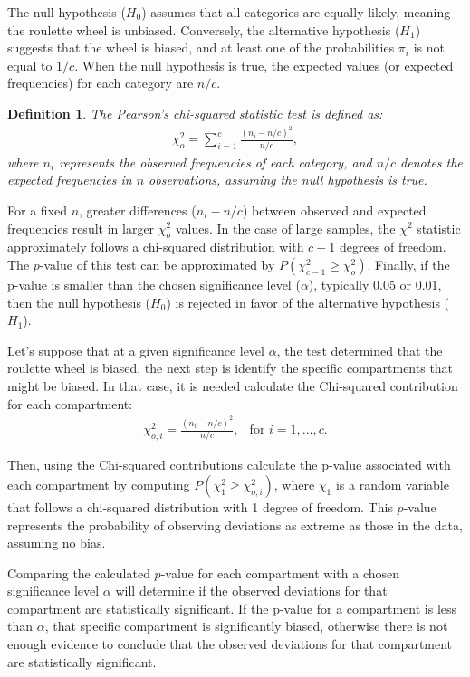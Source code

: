 \documentclass[11pt,twoside]{article}
\newtheorem{Definition}{Definition}
\numberwithin{Theorem}{section}
\numberwithin{Definition}{section}
\numberwithin{Lemma}{section}
\numberwithin{Algorithm}{section}
\numberwithin{equation}{section}
\begin{document}
The null hypothesis ($H_{0}$) assumes that all categories are equally likely, meaning the roulette wheel is unbiased. Conversely, the alternative hypothesis ($H_{1}$) suggests that the wheel is biased, and at least one of the probabilities $\pi_{i}$ is not equal to $1/c$. When the null hypothesis is true, the expected values (or expected frequencies) for each category are $n/c$.

\begin{Definition}
The Pearson's chi-squared statistic test is defined as:
\begin{eqnarray}
\chi_{o}^2 = \sum_{i=1}^{c}\frac{(n_{i} - n/c)^2}{n/c},
\end{eqnarray}
where $n_{i}$ represents the observed frequencies of each category, and $n/c$ denotes the expected frequencies in $n$ observations, assuming the null hypothesis is true.
\end{Definition}

For a fixed $n$, greater differences ($n_{i} - n/c$) between observed and expected frequencies result in larger $\chi_{o}^2 $ values. In the case of large samples, the $\chi^2 $ statistic approximately follows a chi-squared distribution with $c-1$ degrees of freedom\cite{Agresti}. The $p$-value of this test can be approximated by $P(\chi_{c-1}^2 \geq \chi_{o}^2)$. Finally, if the p-value is smaller than the chosen significance level ($\alpha$), typically 0.05 or 0.01, then the null hypothesis ($H_{0}$) is rejected in favor of the alternative hypothesis ($H_{1}$).

Let's suppose that at a given significance level $\alpha$, the test determined that the roulette wheel is biased, the next step is identify the specific compartments that might be biased. In that case, it is needed calculate the Chi-squared contribution for each compartment:
\begin{eqnarray*}
    \chi_{o,i}^2 = \frac{(n_{i} - n/c)^2}{n/c}, & \text{for }i = 1,...,c.
\end{eqnarray*}

Then, using the Chi-squared contributions calculate the p-value associated with each compartment by computing $P(\chi_{1}^2 \geq \chi_{o,i}^2)$, where $\chi_{1}$ is a random variable that follows a chi-squared distribution with 1 degree of freedom. This $p$-value represents the probability of observing deviations as extreme as those in the data, assuming no bias.

Comparing the calculated $p$-value for each compartment with a chosen significance level $\alpha$ will determine if the observed deviations for that compartment are statistically significant. If the p-value for a compartment is less than $\alpha$, that specific compartment is significantly biased, otherwise there is not enough evidence to conclude that the observed deviations for that compartment are statistically significant.
\end{document}
